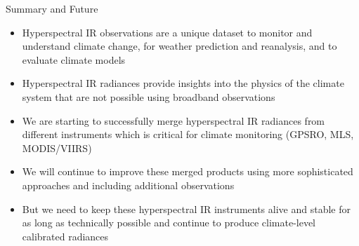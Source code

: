 \documentclass[10pt,t]{beamer}
\begin{document}
\begin{frame}[label={sec:org44223ad}]{Summary and Future}
\begin{itemize}
\item Hyperspectral IR observations are a unique dataset to monitor and understand climate change, for weather prediction and reanalysis, and to evaluate climate models

\item Hyperspectral IR radiances provide insights into the physics of the climate system that are not possible using broadband observations

\item We are starting to successfully merge hyperspectral IR radiances from different instruments which is critical for climate monitoring (GPSRO, MLS, MODIS/VIIRS)

\item We will continue to improve these merged products using more sophisticated approaches and including additional observations

\item But we need to keep these hyperspectral IR instruments alive and stable for as long as technically possible and continue to produce climate-level calibrated radiances
\end{itemize}
\end{frame}
\end{document}
